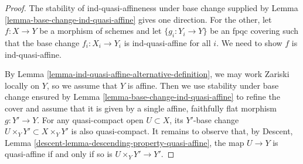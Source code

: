 \documentclass[10pt,a4paper]{amsart}
\theoremstyle{plain}
\theoremstyle{definition}
\theoremstyle{remark}
\numberwithin{equation}{subsection}
\begin{document}
\begin{proof}
The stability of ind-quasi-affineness under base change
supplied by Lemma \ref{lemma-base-change-ind-quasi-affine}
gives one direction. For the other, let $f : X \to Y$
be a morphism of schemes and let $\{g_i : Y_i \to Y\}$
be an fpqc covering such that the base change $f_i : X_i \to Y_i$
is ind-quasi-affine for all $i$. We need to show $f$ is ind-quasi-affine.

\medskip\noindent
By Lemma \ref{lemma-ind-quasi-affine-alternative-definition}, we may work
Zariski locally on $Y$, so we assume that $Y$ is affine.
Then we use stability under base change ensured by
Lemma \ref{lemma-base-change-ind-quasi-affine} to refine the cover
and assume that it is given by a single affine, faithfully flat morphism
$g : Y' \to Y$. For any quasi-compact open $U \subset X$, its
$Y'$-base change $U \times_Y Y' \subset X \times_Y Y'$ is also quasi-compact.
It remains to observe that, by
Descent, Lemma \ref{descent-lemma-descending-property-quasi-affine},
the map $U \to Y$ is quasi-affine if and only if so is $U \times_Y Y' \to Y'$.
\end{proof}
\end{document}
